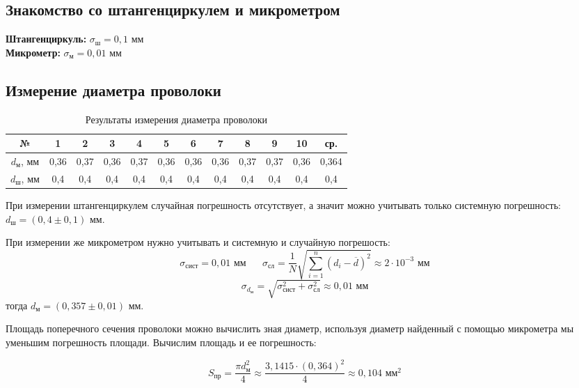 	\subsection{Знакомство со штангенциркулем и микрометром}
	
	\textbf{Штангенциркуль:} $ \sigma_\text{ш} = 0,1 \text{ мм}$\\
	\textbf{Микрометр:} $ \sigma_\text{м} = 0,01 \text{ мм}$
	
	
	\subsection{Измерение диаметра проволоки}
	\begin{table}[h]
		\begin{center}
			\begin{tabular}{|c|c|c|c|c|c|c|c|c|c|c|c|}
				\hline
				№ & 1 & 2 & 3 & 4 & 5 & 6 & 7 & 8 & 9 & 10 & ср. \\
				\hline
				$d_\text{м}$, мм & 0,36 & 0,37& 0,36& 0,37& 0,36& 0,36& 0,36& 0,37& 0,37& 0,36& 0,364\\ 
				\hline
				$d_\text{ш}$, мм & 0,4 & 0,4 & 0,4 & 0,4 & 0,4 & 0,4 & 0,4 & 0,4 & 0,4 & 0,4 & 0,4\\ 
				\hline
			\end{tabular}
		\end{center}
		\caption{Результаты измерения диаметра проволоки}
		\label{dtab}
	\end{table}
	
	При измерении штангенциркулем случайная погрешность отсутствует, а значит можно учитывать только системную погрешность: $d_\text{ш} = \left( 0,4 \pm 0,1 \right) \text{ мм}$.
	
	При измерении же микрометром нужно учитывать и системную и случайную погрешость:
	$$\sigma_\text{сист}=0,01\text{ мм}\;\;\;\;\;\; \sigma_\text{сл}=\frac{1}{N} \sqrt{\sum_{i=1}^{n}(d_i - \overline{d})^2}\approx 2\cdot 10^{-3} \text{ мм}$$
	$$\sigma_{d_\text{м}} = \sqrt{\sigma_\text{сист}^2+\sigma_\text{сл}^2}\approx 0,01 \text{ мм}$$
	\noindent тогда $d_\text{м} = \left( 0,357 \pm 0,01 \right) \text{ мм}$.
	
	Площадь поперечного сечения проволоки можно вычислить зная диаметр, используя диаметр найденный с помощью микрометра мы уменьшим погрешность площади. Вычислим площадь и ее погрешность:
	
	\begin{equation}
		S_\text{пр} = \frac{\pi d_\text{м}^2}{4} \approx \frac{3,1415\cdot (0,364)^2}{4} \approx 0,104 \text{ мм}^2
	\end{equation}
	
